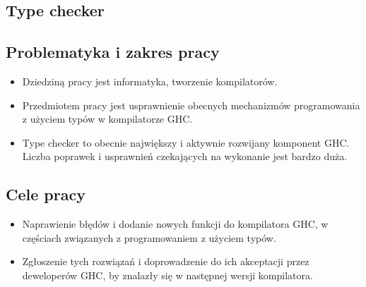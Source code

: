 \documentclass[polish]{beamer}
\makeatletter
\newcommand*{\currentname}{\@currentlabelname}
\makeatother
\begin{document}
\subsection{Type checker} %
\begin{frame}[c]{\currentname}
\begin{figure}[H]       
    \centering
\end{figure}
\end{frame}

\subsection{Problematyka i zakres pracy} %
\begin{tframe}{\currentname}
    \begin{itemize}
        \item Dziedziną pracy jest informatyka, tworzenie kompilatorów. 
        
        \item Przedmiotem pracy jest usprawnienie obecnych mechanizmów programowania z użyciem typów w kompilatorze GHC.
         
        \item Type checker to obecnie największy i aktywnie rozwijany komponent GHC\cite{AOSA}. Liczba poprawek i usprawnień czekających na wykonanie jest bardzo duża. 
    \end{itemize}
\end{tframe}

\subsection{Cele pracy} %
\begin{tframe}{\currentname}
    \begin{itemize}
        \item Naprawienie błędów i dodanie nowych funkcji do kompilatora GHC, w częściach związanych z programowaniem z użyciem typów.
        \item Zgłoszenie tych rozwiązań i doprowadzenie do ich akceptacji przez deweloperów GHC, by znalazły się w następnej wersji kompilatora. 
    \end{itemize}

    
\end{tframe}
\end{document}
